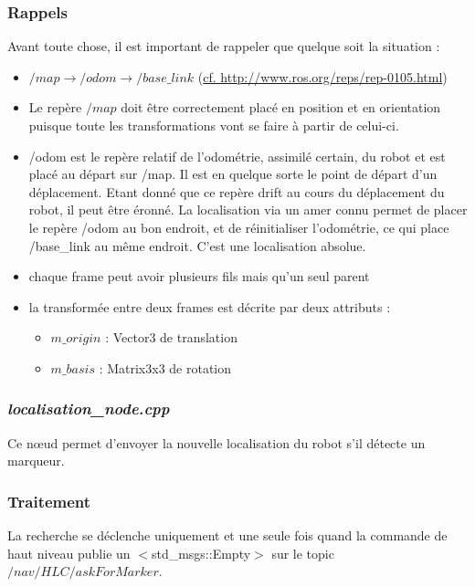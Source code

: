 \documentclass[10pt,a4paper]{article}
\begin{document}
\subsubsection*{Rappels}
Avant toute chose, il est important de rappeler que quelque soit la situation :
\begin{itemize}
\item $/map \rightarrow /odom \rightarrow /base\_link $ (\url{cf. http://www.ros.org/reps/rep-0105.html})
\item Le repère $/map$ doit être correctement placé en position et en orientation puisque toute les transformations vont se faire à partir de celui-ci.
\item /odom est le repère relatif de l'odométrie, assimilé certain, du robot et est placé au départ sur /map. Il est en quelque sorte le point de départ d'un déplacement. Etant donné que ce repère drift au cours du déplacement du robot, il peut être éronné. La localisation via un amer connu permet de placer le repère /odom au bon endroit, et de réinitialiser l'odométrie, ce qui place /base\_link au même endroit. C'est une localisation absolue.
\item chaque frame peut avoir plusieurs fils mais qu'un seul parent
\item la transformée entre deux frames est décrite par deux attributs : 
  \begin{itemize}
  \item $m\_origin$ : Vector3 de translation 
  \item $m\_basis$ : Matrix3x3 de rotation
  \end{itemize}
\end{itemize}

\subsubsection{\textit{localisation\_node.cpp}}
Ce nœud permet d'envoyer la nouvelle localisation du robot s'il détecte un marqueur. 

\subsubsection*{Traitement}
\noindent La recherche se déclenche uniquement et une seule fois quand la commande de haut niveau publie un $<$std\_msgs::Empty$>$ sur le topic $/nav/HLC/askForMarker$. 
\end{document}
